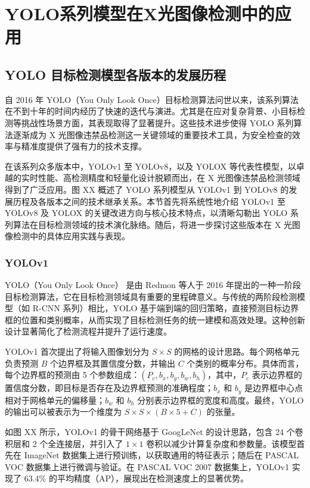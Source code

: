 \documentclass[11pt,twocolumn]{ctexart}
\begin{document}
\section{YOLO系列模型在X光图像检测中的应用}

\subsection{YOLO 目标检测模型各版本的发展历程}

自 2016 年 YOLO（You Only Look Once）目标检测算法问世以来，该系列算法在不到十年的时间内经历了快速的迭代与演进。尤其是在应对复杂背景、小目标检测等挑战性场景方面，其表现取得了显著提升。这些技术进步使得 YOLO 系列算法逐渐成为 X 光图像违禁品检测这一关键领域的重要技术工具，为安全检查的效率与精准度提供了强有力的技术支撑。

在该系列众多版本中，YOLOv1 至 YOLOv8，以及 YOLOX 等代表性模型，以卓越的实时性能、高检测精度和轻量化设计脱颖而出，在 X 光图像违禁品检测领域得到了广泛应用。图 XX 概述了 YOLO 系列模型从 YOLOv1 到 YOLOv8 的发展历程及各版本之间的技术继承关系。本节首先将系统性地介绍 YOLOv1 至 YOLOv8 及 YOLOX 的关键改进方向与核心技术特点，以清晰勾勒出 YOLO 系列算法在目标检测领域的技术演化脉络。随后，将进一步探讨这些版本在 X 光图像检测中的具体应用实践与表现。
\subsubsection{YOLOv1}
YOLO（You Only Look Once）\cite{redmon2016you} 是由 Redmon 等人于 2016 年提出的一种一阶段目标检测算法，它在目标检测领域具有重要的里程碑意义。与传统的两阶段检测模型（如 R-CNN\cite{girshick2014rich,girshick2015fast,ren2016faster} 系列）相比，YOLO 基于端到端的回归策略，直接预测目标边界框的位置和类别概率，从而实现了目标检测任务的统一建模和高效处理。这种创新设计显著简化了检测流程并提升了运行速度。

YOLOv1 首次提出了将输入图像划分为 $S \times S$ 的网格的设计思路。每个网格单元负责预测 $B$ 个边界框及其置信度分数，并输出 $C$ 个类别的概率分布。具体而言，每个边界框的预测由 5 个参数组成：$(P_c, b_x, b_y, b_w, b_h)$，其中，$P_c$ 表示边界框的置信度分数，即目标是否存在及边界框预测的准确程度；$b_x$ 和 $b_y$ 是边界框中心点相对于网格单元的偏移量；$b_w$ 和 $b_h$ 分别表示边界框的宽度和高度。最终，YOLO 的输出可以被表示为一个维度为 $S \times S \times (B \times 5 + C)$ 的张量。

如图 XX 所示，YOLOv1 的骨干网络基于 GoogLeNet\cite{szegedy2015going} 的设计思路，包含 24 个卷积层和 2 个全连接层，并引入了 $1 \times 1$ 卷积以减少计算复杂度和参数量。该模型首先在 ImageNet 数据集上进行预训练，以获取通用的特征表示；随后在 PASCAL VOC 数据集上进行微调与验证。在 PASCAL VOC 2007 数据集上，YOLOv1 实现了 63.4\% 的平均精度（AP），展现出在检测速度上的显著优势。
\end{document}
